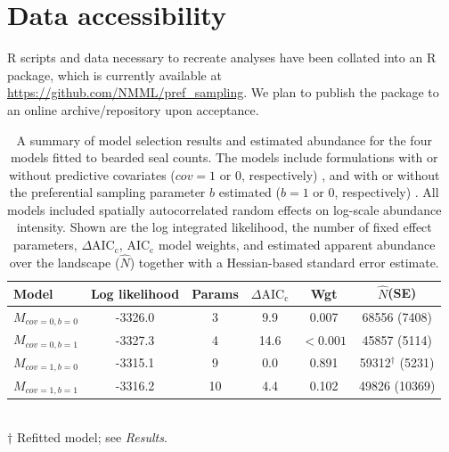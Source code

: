 \documentclass[times,mee,doublespace,]{besauth2}
\begin{document}
\section{Data accessibility} 
R scripts and data necessary to recreate analyses have been collated into an R package, which is currently available at \url{https://github.com/NMML/pref_sampling}.  We plan to publish the package to an online archive/repository upon acceptance. \\






\pagebreak
\begin{table}[ht]
\caption{A summary of model selection results and estimated abundance for the four models fitted to bearded seal counts.  The models include formulations with or without predictive covariates ($cov=1$ or 0, respectively) , and with or without the preferential sampling parameter $b$ estimated ($b=1$ or 0, respectively) .  All models included spatially autocorrelated random effects on log-scale abundance intensity.  Shown are the log integrated likelihood, the number of fixed effect parameters, $\Delta \textrm{AIC}_\textrm{c}$, $\textrm{AIC}_\textrm{c}$ model weights, and estimated apparent abundance over the landscape ($\hat{N}$) together with a Hessian-based standard error estimate.
}
\label{tab:aic}
\raggedright
\begin{tabular}{lccccc}
  \hline
  Model & Log likelihood & Params & $\Delta \textrm{AIC}_\textrm{c}$ & Wgt & $\hat{N}$(SE) \\
  \hline
  $M_{cov=0,b=0}$ & -3326.0 & 3 & 9.9 & 0.007 & 68556 (7408)\\
  $M_{cov=0,b=1}$ & -3327.3 & 4 & 14.6 & $<0.001$ & 45857 (5114) \\
  $M_{cov=1,b=0}$ & -3315.1 & 9 & 0.0 & 0.891 & 59312$^\dag$ (5231)  \\
  $M_{cov=1,b=1}$ & -3316.2 & 10 & 4.4 & 0.102 & 49826 (10369) \\
\hline
\end{tabular}
\\
$\dag$ Refitted model; see \textit{Results}.
\end{table}

\pagebreak
\end{document}
